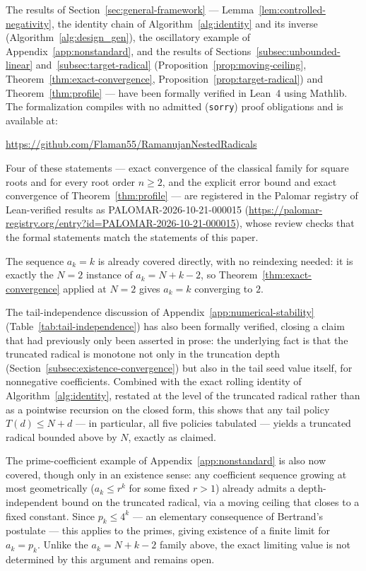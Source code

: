 \documentclass[11pt,a4paper]{amsart}
\theoremstyle{plain}
\theoremstyle{definition}
\theoremstyle{remark}
\begin{document}
The results of Section~\ref{sec:general-framework} — Lemma~\ref{lem:controlled-negativity}, the identity chain of Algorithm~\ref{alg:identity} and its inverse (Algorithm~\ref{alg:design_gen}), the oscillatory example of Appendix~\ref{app:nonstandard}, and the results of Sections~\ref{subsec:unbounded-linear} and~\ref{subsec:target-radical} (Proposition~\ref{prop:moving-ceiling}, Theorem~\ref{thm:exact-convergence}, Proposition~\ref{prop:target-radical}) and Theorem~\ref{thm:profile} — have been formally verified in Lean~4 using Mathlib. The formalization compiles with no admitted (\texttt{sorry}) proof obligations and is available at:
\begin{center}
\url{https://github.com/Flaman55/RamanujanNestedRadicals}
\end{center}
{\sloppy Four of these statements --- exact convergence of the classical family for square roots and for every root order $n \ge 2$, and the explicit error bound and exact convergence of Theorem~\ref{thm:profile} --- are registered in the Palomar registry of Lean-verified results as PALOMAR-2026-10-21-000015 (\url{https://palomar-registry.org/entry?id=PALOMAR-2026-10-21-000015}), whose review checks that the formal statements match the statements of this paper.\par}

The sequence $a_k=k$ is already covered directly, with no reindexing needed: it is exactly the $N=2$ instance of $a_k=N+k-2$, so Theorem~\ref{thm:exact-convergence} applied at $N=2$ gives $a_k=k$ converging to $2$.

The tail-independence discussion of Appendix~\ref{app:numerical-stability} (Table~\ref{tab:tail-independence}) has also been formally verified, closing a claim that had previously only been asserted in prose: the underlying fact is that the truncated radical is monotone not only in the truncation depth (Section~\ref{subsec:existence-convergence}) but also in the tail seed value itself, for nonnegative coefficients. Combined with the exact rolling identity of Algorithm~\ref{alg:identity}, restated at the level of the truncated radical rather than as a pointwise recursion on the closed form, this shows that any tail policy $T(d) \le N+d$ — in particular, all five policies tabulated — yields a truncated radical bounded above by $N$, exactly as claimed.

The prime-coefficient example of Appendix~\ref{app:nonstandard} is also now covered, though only in an existence sense: any coefficient sequence growing at most geometrically ($a_k \le r^k$ for some fixed $r>1$) already admits a depth-independent bound on the truncated radical, via a moving ceiling that closes to a fixed constant. Since $p_k \le 4^k$ — an elementary consequence of Bertrand's postulate — this applies to the primes, giving existence of a finite limit for $a_k=p_k$. Unlike the $a_k=N+k-2$ family above, the exact limiting value is not determined by this argument and remains open.
\end{document}
